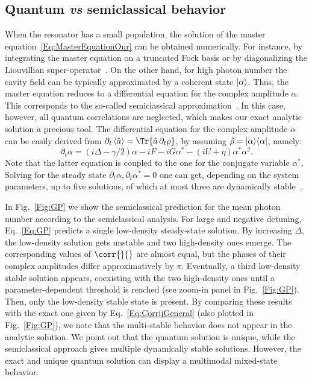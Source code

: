 \subsection{Quantum \emph{vs} semiclassical behavior}\label{subsec:semiclassical}

When the resonator has a small population, the solution of the master equation~\eqref{Eq:MasterEquationOur} can be obtained numerically.
For instance, by integrating the master equation on a truncated Fock basis or by diagonalizing the Liouvillian super-operator~\cite{CasteelsPRA16}.
On the other hand, for high photon number the cavity field can be typically approximated by a coherent state $\ket{\alpha}$.
Thus, the master equation reduces to a differential equation for the complex amplitude $\alpha$.
This corresponds to the so-called semiclassical approximation~\cite{CarusottoRMP13}.
In this case, however, all quantum correlations are neglected, which makes our exact analytic solution a precious tool.
The differential equation for the complex amplitude $\alpha$ can be easily derived from $\partial_t\braket{\hat{a}}=\Tr{\hat{a}\,\partial_t \rho}$, by assuming $\hat{\rho}=\ket{\alpha}\!\bra{\alpha}$, namely:
\begin{equation}\label{Eq:GP}
	\partial_t\alpha=(i\Delta-\gamma/2)\alpha -iF -iG\alpha^* -(iU+\eta)\alpha^*\alpha^2.
\end{equation}
Note that the latter equation is coupled to the one for the conjugate variable $\alpha^*$.
Solving for the steady state $\partial_t\alpha,\partial_t\alpha^*=0$ one can get, depending on the system parameters, up to five solutions, of which at most three are dynamically stable~\cite{MeaneyEPJQT14,ElliottarXiv16}.

In Fig.~\ref{Fig:GP} we show the semiclassical prediction for the mean photon number according to the semiclassical analysis.
For large and negative detuning, Eq.~\eqref{Eq:GP} predicts a single low-density steady-state solution.
By increasing $\Delta$, the low-density solution gets unstable and two high-density ones emerge.
The corresponding values of $\corr{}{}$ are almost equal, but the phases of their complex amplitudes differ approximatively by $\pi$.
Eventually, a third low-density stable solution appears, coexisting with the two high-density ones until a parameter-dependent threshold is reached (see zoom-in panel in Fig.~\ref{Fig:GP}).
Then, only the low-density stable state is present.
By comparing these results with the exact one given by Eq.~\eqref{Eq:CorrijGeneral} (also plotted in Fig.~\ref{Fig:GP}), we note that the multi-stable behavior does not appear in the analytic solution.
We point out that the quantum solution is unique, while the semiclassical approach gives multiple dynamically stable solutions.
However, the exact and unique quantum solution can display a multimodal mixed-state behavior.

